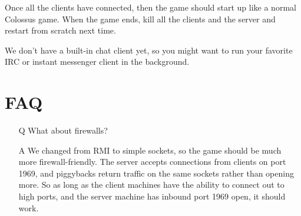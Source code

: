 \documentclass{article}
\begin{document}
Once all the clients have connected, then the game should start up like
a normal Colossus game.  When the game ends, kill all the clients and
the server and restart from scratch next time.

We don't have a built-in chat client yet, so you might want to run
your favorite IRC or instant messenger client in the background. 


\section{FAQ}

\begin{itemize}

\item[Q] What about firewalls?

\item[A] We changed from RMI to simple sockets, so the game should be
much more firewall-friendly.  The server accepts connections from 
clients on port 1969, and piggybacks return traffic on the same sockets
rather than opening more.  So as long as the client machines have the
ability to connect out to high ports, and the server machine has inbound
port 1969 open, it should work.

\end{itemize}
\end{document}
